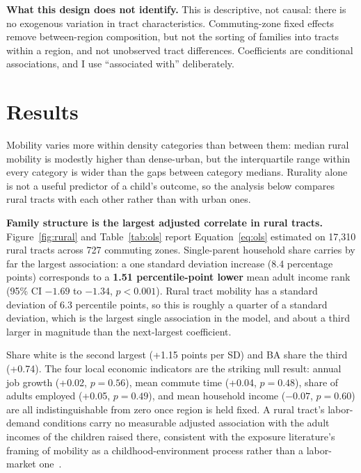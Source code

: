 \documentclass[9pt,twoside]{pnas-new}
\begin{document}
\noindent\textbf{What this design does not identify.} This is descriptive, not
causal: there is no exogenous variation in tract characteristics.
Commuting-zone fixed effects remove between-region composition, but not the
sorting of families into tracts within a region, and not unobserved tract
differences. Coefficients are conditional associations, and I use ``associated
with'' deliberately.

\section{Results}
\label{sec:results}

Mobility varies more within density categories than between them: median
rural mobility is modestly higher than dense-urban, but the interquartile
range within every category is wider than the gaps between category medians.
Rurality alone is not a useful predictor of a child's outcome, so the
analysis below compares rural tracts with each other rather than with urban
ones.

\noindent\textbf{Family structure is the largest adjusted correlate in rural tracts.}
Figure~\ref{fig:rural} and Table~\ref{tab:ols} report Equation~\ref{eq:ols}
estimated on 17{,}310 rural tracts across 727 commuting zones. Single-parent
household share carries by far the largest association: a one standard
deviation increase (8.4 percentage points) corresponds to a
\textbf{1.51 percentile-point lower} mean adult income rank (95\% CI $-1.69$ to
$-1.34$, $p<0.001$). Rural tract mobility has a standard deviation of 6.3
percentile points, so this is roughly a quarter of a standard deviation, which
is the largest single association in the model, and about a third larger in
magnitude than the next-largest coefficient.

Share white is the second largest (+1.15 points per SD) and BA share the third
(+0.74). The four local economic indicators are the striking null result:
annual job growth (+0.02, $p=0.56$), mean commute time (+0.04, $p=0.48$), share
of adults employed (+0.05, $p=0.49$), and mean household income ($-0.07$,
$p=0.60$) are all indistinguishable from zero once region is held fixed. A
rural tract's labor-demand conditions carry no measurable adjusted association
with the adult incomes of the children raised there, consistent with the
exposure literature's framing of mobility as a childhood-environment process
rather than a labor-market one~\cite{chetty2015mto}.
\end{document}
